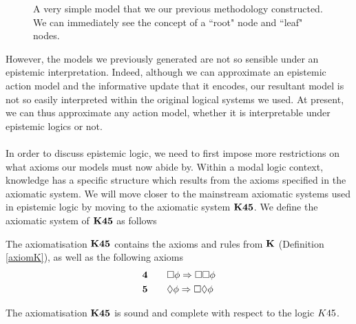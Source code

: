\begin{figure}
\centering
{}
\caption[Example of constructions in $\AXK$]{A very simple model that we our previous methodology constructed.
We can immediately see the concept of a ``root" node and ``leaf" nodes.}
\label{exampleModelConstruct}
\end{figure}

However, the models we previously generated are not so sensible under an epistemic interpretation.
Indeed, although we can approximate an epistemic action model and the informative update that it
encodes, our resultant model is not so easily interpreted within the original logical systems we
used.
At present, we can thus approximate any action model, whether it is interpretable under epistemic
logics or not.\\
\\
In order to discuss epistemic logic, we need to first impose more restrictions on what axioms our
models must now abide by.
Within a modal logic context, knowledge has a specific structure which results from the axioms
specified in the axiomatic system.
We will move closer to the mainstream axiomatic systems used in epistemic logic by moving to the
axiomatic system $\bf K45$.
We define the axiomatic system of $\bf K45$ as follows

\begin{defn} \label{axiomK45}
The axiomatisation $\bf K45$ contains the axioms and rules from $\AXK$ (Definition
    \ref{axiomK}), as well as the following axioms
\begin{alignat*}{2}
  & \bf 4 && \quad \Box \phi \Rightarrow \Box \Box \phi \\
  & \bf 5 && \quad \Diamond \phi \Rightarrow \Box \Diamond \phi
\end{alignat*}
\end{defn}

\begin{lemma} \label{axiomK45SoundComplete}
The axiomatisation $\bf K45$ is sound and complete with respect to the logic
$K45$.
\end{lemma}

